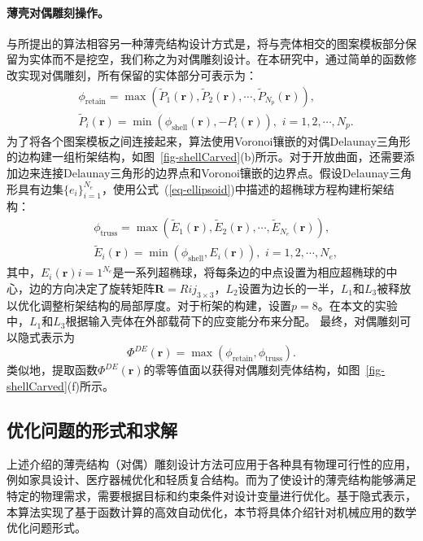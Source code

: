 \paragraph{薄壳对偶雕刻操作。}
与所提出的算法相容另一种薄壳结构设计方式是，将与壳体相交的图案模板部分保留为实体而不是挖空，我们称之为对偶雕刻设计。在本研究中，通过简单的函数修改实现对偶雕刻，所有保留的实体部分可表示为：
\begin{equation}
    \begin{split}
        &\phi_{\mathrm{retain}}=\max(\tilde{P}_1(\mathbf{r}), \tilde{P}_2(\mathbf{r}), \cdots, \tilde{P}_{N_p}(\mathbf{r})),\\
        &\tilde{P}_i(\mathbf{r})=\min(\phi_{\mathrm{shell}}(\mathbf{r}), -P_i(\mathbf{r})), \,\, i=1,2,\cdots, N_p.
    \end{split}
\end{equation}
为了将各个图案模板之间连接起来，算法使用Voronoi镶嵌的对偶Delaunay三角形的边构建一组桁架结构，如图~\ref{fig-shellCarved}(b)所示。对于开放曲面，还需要添加边来连接Delaunay三角形的边界点和Voronoi镶嵌的边界点。假设Delaunay三角形具有边集$\{e_i\}_{i=1}^{N_e}$，使用公式~(\ref{eq-ellipsoid})中描述的超椭球方程构建桁架结构：
\begin{equation}
    \begin{split}
        &\phi_{\mathrm{truss}} = \max(\tilde{E}_1(\mathbf{r}), \tilde{E}_2(\mathbf{r}), \cdots, \tilde{E}_{N_e}(\mathbf{r})),\\
        &\tilde{E}_i(\mathbf{r})=\min(\phi_{\mathrm{shell}},E_i(\mathbf{r})),\,\, i = 1, 2, \cdots, N_e,
    \end{split}
\end{equation}
其中，${E_i(\mathbf{r})}{i=1}^{N_e}$是一系列超椭球，将每条边的中点设置为相应超椭球的中心，边的方向决定了旋转矩阵$\mathbf{R}={R{ij}}_{3\times 3}$，$L_2$设置为边长的一半，$L_1$和$L_3$被释放以优化调整桁架结构的局部厚度。对于桁架的构建，设置$p=8$。在本文的实验中，$L_1$和$L_3$根据输入壳体在外部载荷下的应变能分布来分配。
最终，对偶雕刻可以隐式表示为
\begin{equation}
	\Phi^{DE}(\mathbf{r})=\max(\phi_{\mathrm{retain}}, \phi_{\mathrm{truss}}).
\end{equation}
类似地，提取函数$\Phi^{DE}(\mathbf{r})$的零等值面以获得对偶雕刻壳体结构，如图~\ref{fig-shellCarved}(f)所示。

\subsection{优化问题的形式和求解}\label{sec:formulation}
上述介绍的薄壳结构（对偶）雕刻设计方法可应用于各种具有物理可行性的应用，例如家具设计、医疗器械优化和轻质复合结构。而为了使设计的薄壳结构能够满足特定的物理需求，需要根据目标和约束条件对设计变量进行优化。基于隐式表示，本算法实现了基于函数计算的高效自动优化，本节将具体介绍针对机械应用的数学优化问题形式。

